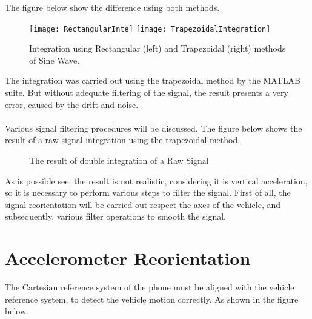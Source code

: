 \documentclass[tesi]{subfiles}
\begin{document}
The figure below show the difference using both methods.

\begin{figure}[H]
\centering
\texttt{[image: RectangularInte]}
\hspace{0.5cm}
\texttt{[image: TrapezoidalIntegration]}
\caption{Integration using Rectangular (left) and Trapezoidal (right) methods of Sine Wave.}
\label{fig:Rectangular and Trapezoidal Integration}
\end{figure}

\noindent The integration was carried out using the trapezoidal method by the MATLAB suite. But without adequate filtering of the signal, the result presents a very error, caused by the drift and noise. \\\\
Various signal filtering procedures will be discussed. The figure below shows the result of a raw signal integration using the  trapezoidal method.

\begin{figure}[H]
  \centering
  

  \caption{The result of double integration of a Raw Signal}
  \label{fig:Integration of Raw Data}
\end{figure}
\clearpage

\noindent As is possible see, the result is not realistic, considering it is vertical acceleration, so it is necessary to perform various steps to filter the signal. First of all, the signal reorientation will be carried out respect the axes of the vehicle, and subsequently, various filter operations to smooth the signal.

\section{Accelerometer Reorientation} \label{sc:Accelerometer Reorientation}
\noindent The Cartesian reference system of the phone must be aligned with the vehicle reference system, to detect the vehicle motion correctly.
As shown in the figure below.
\end{document}
